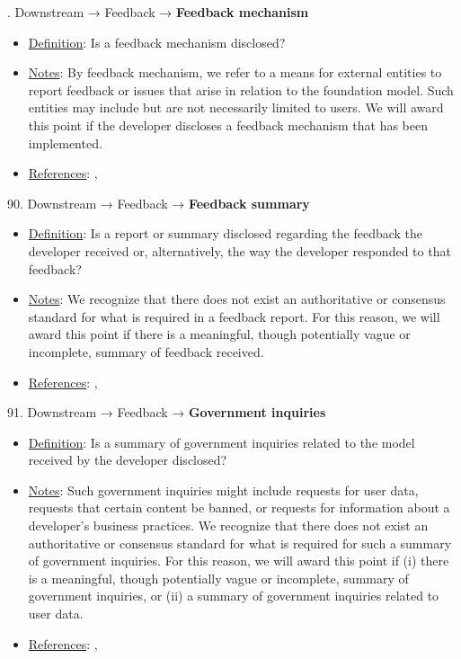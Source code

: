 . Downstream → Feedback → \textbf{Feedback mechanism}
\vspace{-\parskip}
\begin{itemize}
\item
\underline{Definition}: Is a feedback mechanism disclosed?
\item
\underline{Notes}: By feedback mechanism, we refer to a means for external entities to report feedback or issues that arise in relation to the foundation model. Such entities may include but are not necessarily limited to users. We will award this point if the developer discloses a feedback mechanism that has been implemented.
\item
\underline{References}: \citet{bommasani2023ecosystem}, \citet{raji2022audit}
\end{itemize}


90. Downstream → Feedback → \textbf{Feedback summary}
\vspace{-\parskip}
\begin{itemize}
\item
\underline{Definition}: Is a report or summary disclosed regarding the feedback the developer received or, alternatively, the way the developer responded to that feedback?
\item
\underline{Notes}: We recognize that there does not exist an authoritative or consensus standard for what is required in a feedback report. For this reason, we will award this point if there is a meaningful, though potentially vague or incomplete, summary of feedback received.
\item
\underline{References}: \citet{chen2021achieving}, \citet{piorkowski2022evaluating}
\end{itemize}


91. Downstream → Feedback → \textbf{Government inquiries}
\vspace{-\parskip}
\begin{itemize}
\item
\underline{Definition}: Is a summary of government inquiries related to the model received by the developer disclosed?
\item
\underline{Notes}: Such government inquiries might include requests for user data, requests that certain content be banned, or requests for information about a developer’s business practices. We recognize that there does not exist an authoritative or consensus standard for what is required for such a summary of government inquiries. For this reason, we will award this point if (i) there is a meaningful, though potentially vague or incomplete, summary of government inquiries, or (ii) a summary of government inquiries related to user data.
\item
\underline{References}: \citet{chou2012government}, \citet{bommasani2023ecosystem}
\end{itemize}


